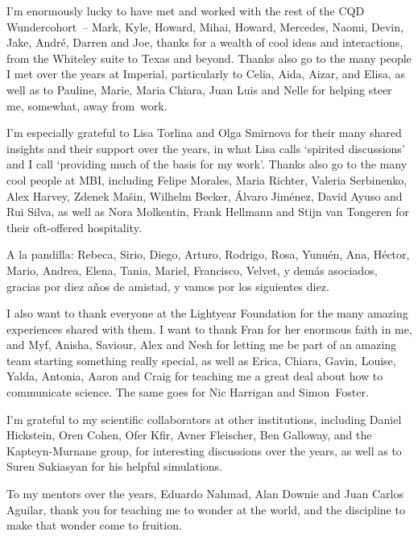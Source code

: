 \vspace{\ackskip}
\noindent
I'm enormously lucky to have met and worked with the rest of the CQD Wundercohort~-- Mark, Kyle, Howard, Mihai, Howard, Mercedes, Naomi, Devin, Jake, André, Darren and Joe, thanks for a wealth of cool ideas and interactions, from the Whiteley suite to Texas and beyond. Thanks also go to the many people I met over the years at Imperial, particularly to Celia, Aida, Aizar, and Elisa, as well as to Pauline, Marie, Maria Chiara, Juan Luis and Nelle for helping steer me, somewhat, away from~work.


\vspace{\ackskip}
\noindent
I'm especially grateful to Lisa Torlina and Olga Smirnova for their many shared insights and their support over the years, in what Lisa calls `spirited discussions' and I call `providing much of the basis for my work'. Thanks also go to the many cool people at MBI, including Felipe Morales, Maria Richter, Valeria Serbinenko, Alex Harvey, Zdenek Ma\v{s}in, Wilhelm Becker, Álvaro Jiménez, David Ayuso and Rui Silva, as well as Nora Molkentin, Frank Hellmann and Stijn van Tongeren for their oft-offered hospitality.


\vspace{\ackskip}
\noindent
A la pandilla: Rebeca, Sirio, Diego, Arturo, Rodrigo, Rosa, Yunuén, Ana, Héctor, Mario, Andrea, Elena, Tania, Mariel, Francisco, Velvet, y demás asociados, gracias por diez años de amistad, y vamos por los siguientes diez. 


\vspace{\ackskip}
\noindent
I also want to thank everyone at the Lightyear Foundation for the many amazing experiences shared with them. I want to thank Fran for her enormous faith in me, and Myf, Anisha, Saviour, Alex and Nesh for letting me be part of an amazing team starting something really special, as well as Erica, Chiara, Gavin, Louise, Yalda, Antonia, Aaron and Craig for teaching me a great deal about how to communicate science. The same goes for Nic Harrigan and Simon~Foster.

\vspace{\ackskip}
\noindent
I'm grateful to my scientific collaborators at other institutions, including Daniel Hickstein, Oren Cohen, Ofer Kfir, Avner Fleischer, Ben Galloway, and the Kapteyn-Murnane group, for interesting discussions over the years, as well as to Suren Sukiasyan for his helpful simulations. 

\vspace{\ackskip}
\noindent
To my mentors over the years, Eduardo Nahmad, Alan Downie and Juan Carlos Aguilar, thank you for teaching me to wonder at the world, and the discipline to make that wonder come to fruition. 

